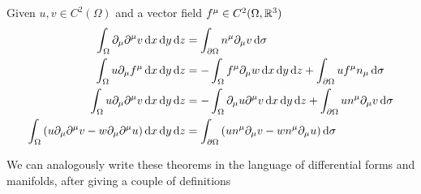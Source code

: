 \documentclass[../complete.tex]{subfiles}
\begin{document}
\begin{thm}
	Given $u,v\in C^2(\Omega)$ and a vector field $f^\mu\in C^2(\Omega,\mathbb{R}^3)$
	\begin{equation}
		\begin{aligned}
			\int_{\Omega}\del_\mu\del^\mu v\diff x\diff y\diff z&=\int_{\del\Omega}n^\mu\del_\mu v\diff\sigma\\
			\int_\Omega u\del_\mu f^\mu\diff x\diff y\diff z&=-\int_\Omega f^\mu\del_\mu w\diff x\diff y\diff z+\int_{\del\Omega}uf^\mu n_\mu\diff\sigma\\
			\int_\Omega u\del_\mu\del^\mu v\diff x\diff y\diff z&=-\int_\Omega \del_\mu u\del^\mu v\diff x\diff y\diff z+\int_{\del\Omega}un^\mu\del_\mu v\diff\sigma\\
			\int_{\Omega}\left( u\del_\mu\del^\mu v-w\del_\mu\del^\mu u \right)\diff x\diff y\diff z&=\int_{\del\Omega}\left( un^\mu\del_\mu v-wn^\mu\del_\mu u \right)\diff\sigma
		\end{aligned}
		\label{eq:usefulidinthm}
	\end{equation}
\end{thm}
We can analogously write these theorems in the language of differential forms and manifolds, after giving a couple of definitions
\end{document}
